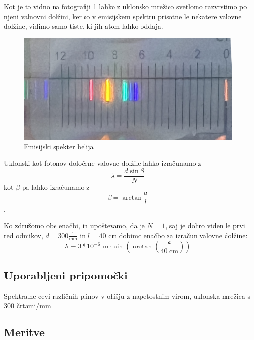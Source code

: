 \documentclass[12pt]{article}
\begin{document}
	Kot je to vidno na fotografiji \ref{fig:mavrica} lahko z uklonsko mrežico svetlomo razvrstimo
	po njeni valnovni dolžini, ker so v emisijskem spektru prisotne le nekatere valovne dolžine,
	vidimo samo tiste, ki jih atom lahko oddaja.

	\begin{figure}[h!]
		\centering
		\includegraphics[width=0.8\linewidth]{slike/IMG_3563.png}
		\caption{Emisijski spekter helija}
		\label{fig:mavrica}
	\end{figure}

	Uklonski kot fotonov določene valovne dolžile lahko izračunamo z
	\begin{equation}
		\lambda = \frac{d \sin{\beta}}{N}
	\end{equation}
	kot $\beta$ pa lahko izračunamo z
	\begin{equation}
		\beta=\arctan{\frac{a}{l}}
	\end{equation}.

	Ko združomo obe enačbi, in upoštevamo, da je $N = 1$, saj je dobro viden le prvi red odmikov,
	$d = 300 \frac{1}{\text{mm}}$ in $l = 40 \text{ cm}$ dobimo enačbo za izračun valovne dolžine:
	\begin{equation}
		\lambda = 3 * 10^{-6} \text{ m} \cdot \sin{(\arctan{(\frac{a}{40 \text{ cm}})})}
	\end{equation}

	\null
	\subsection*{Uporabljeni pripomočki}
	Spektralne cevi različnih plinov v ohišju z napetostnim virom, uklonska mrežica s 300 črtami/mm
	\subsection*{Meritve}
\end{document}
